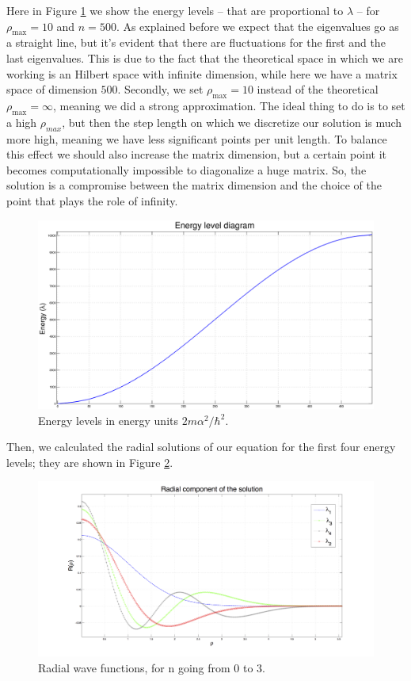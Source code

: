 \documentclass {article}
\begin{document}
Here in Figure \ref{fig:energy_levels_one_electron} we show the energy levels -- that are proportional to $\lambda$ -- for $\rho_{\max}=10$ and $n=500$. As explained before we expect that the eigenvalues go as a straight line, but it's evident that there are fluctuations for the first and the last eigenvalues. This is due to the fact that the theoretical space in which we are working is an Hilbert space with infinite dimension, while here we have a matrix space of dimension $500$. Secondly, we set $\rho_{\max}=10$ instead of the theoretical $\rho_{\max}=\infty$, meaning we did a strong approximation. The ideal thing to do is to set a high $\rho_{max}$, but then the step length on which we discretize our solution is much more high, meaning we have less significant points per unit length. To balance this effect we should also increase the matrix dimension, but a certain point it becomes computationally impossible to diagonalize a huge matrix. So, the solution is a compromise between the matrix dimension and the choice of the point that plays the role of infinity.

\begin{figure}[H]
	\centering
	\includegraphics[width=16cm]{en}
	\caption{Energy levels in energy units $2m\alpha^2/\hbar^2$.}
	\label{fig:energy_levels_one_electron}
\end{figure}

Then, we calculated the radial solutions of our equation for the first four energy levels; they are shown in Figure \ref{fig:radial_solutions_one_electron}.

\begin{figure}[H]
	\centering
	\includegraphics[width=16cm]{bla}
	\caption{Radial wave functions, for n going from 0 to 3.}
	\label{fig:radial_solutions_one_electron}
\end{figure}
\end{document}
